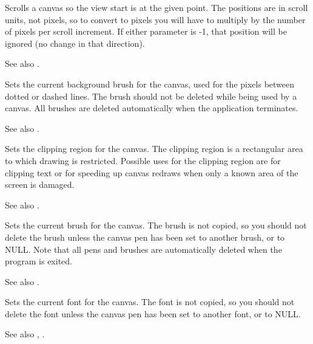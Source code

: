 Scrolls a canvas so the view start is at the given point. The
positions are in scroll units, not pixels, so to convert to pixels you
will have to multiply by the number of pixels per scroll increment.
If either parameter is -1, that position will be ignored (no change in
that direction).

See also .



Sets the current background brush for the canvas, used for the pixels
between dotted or dashed lines.  The brush should not be deleted while
being used by a canvas. All brushes are deleted automatically when the
application terminates.

See also .



Sets the clipping region for the canvas. The clipping region is a
rectangular area to which drawing is restricted.  Possible uses for
the clipping region are for clipping text or for speeding up canvas
redraws when only a known area of the screen is damaged.

See also .



Sets the current brush for the canvas.  The brush is not copied, so
you should not delete the brush unless the canvas pen has been set to
another brush, or to NULL. Note that all pens and brushes are
automatically deleted when the program is exited.

See also .



Sets the current font for the canvas. The font is not copied, so you
should not delete the font unless the canvas pen has been set to
another font, or to NULL.

See also , .

